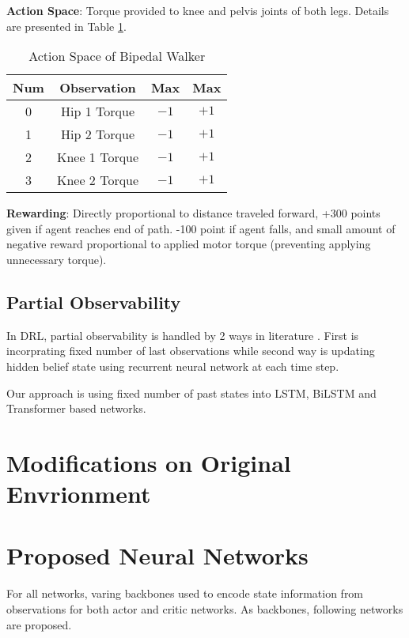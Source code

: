 \textbf{Action Space}: Torque provided to knee and pelvis joints of both legs. Details are presented in Table \ref{table:bpw_act_space}.

\begin{table}[h!]
	\begin{center}
		\begin{tabular}{cccc}
			\textbf{Num} & \textbf{Observation} & \textbf{Max} & \textbf{Max} \\
			\hline
			0  & Hip 1 Torque & $-1$ & $+1$ \\
			1  & Hip 2 Torque & $-1$ & $+1$ \\
			2  & Knee 1 Torque & $-1$ & $+1$ \\
			3  & Knee 2 Torque & $-1$ & $+1$ \\
		\end{tabular}
	\end{center}
	\caption{Action Space of Bipedal Walker}
	\label{table:bpw_act_space}
\end{table}

\textbf{Rewarding}: Directly proportional to distance traveled forward, +300 points given if agent reaches end of path. -100 point if agent falls, and small amount of negative reward proportional to applied motor torque (preventing applying unnecessary torque).

\subsection{Partial Observability}
In DRL, partial observability is handled by 2 ways in literature \cite{dulac-arnold_challenges_2019}. First is incorprating fixed number of last observations while second way is updating hidden belief state using recurrent neural network at each time step. 

Our approach is using fixed number of past states into LSTM, BiLSTM and Transformer based networks. 

\section{Modifications on Original Envrionment}

\section{Proposed Neural Networks}

For all networks, varing backbones used to encode state information from observations for both actor and critic networks. As backbones, following networks are proposed.

